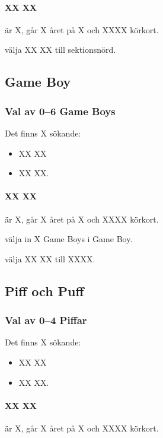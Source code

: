 \documentclass[hidelinks]{sektionsmote}
\begin{document}
\paragraph{XX XX} är X, går X året på X och XXXX körkort.

\begin{beslut}
  \item välja XX XX till sektionsnörd.
\end{beslut}


\subsection{Game Boy}
\subsubsection{Val av 0--6 Game Boys}
Det finns X sökande:
\begin{itemize}
    \item XX XX
    \item XX XX.
\end{itemize}

\paragraph{XX XX} är X, går X året på X och XXXX körkort.

\begin{beslut}
  \item välja in X Game Boys i Game Boy.
\end{beslut}
\begin{beslut}
  \item välja XX XX till XXXX.
\end{beslut}


\subsection{Piff och Puff}
\subsubsection{Val av 0--4 Piffar}
Det finns X sökande:
\begin{itemize}
    \item XX XX
    \item XX XX.
\end{itemize}

\paragraph{XX XX} är X, går X året på X och XXXX körkort.
\end{document}
